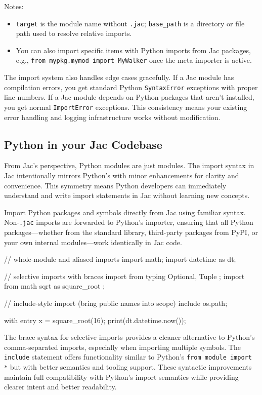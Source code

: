 Notes:
\begin{itemize}
    \item \texttt{target} is the module name without \texttt{.jac}; \texttt{base\_path} is a directory or file path used to resolve relative imports.
    \item You can also import specific items with Python imports from Jac packages, e.g., \texttt{from mypkg.mymod import MyWalker} once the meta importer is active.
\end{itemize}

The import system also handles edge cases gracefully. If a Jac module has compilation errors, you get standard Python \texttt{SyntaxError} exceptions with proper line numbers. If a Jac module depends on Python packages that aren't installed, you get normal \texttt{ImportError} exceptions. This consistency means your existing error handling and logging infrastructure works without modification.

\subsection{Python in your Jac Codebase}

From Jac's perspective, Python modules are just modules. The import syntax in Jac intentionally mirrors Python's with minor enhancements for clarity and convenience. This symmetry means Python developers can immediately understand and write import statements in Jac without learning new concepts.

Import Python packages and symbols directly from Jac using familiar syntax. Non-\texttt{.jac} imports are forwarded to Python's importer, ensuring that all Python packages—whether from the standard library, third-party packages from PyPI, or your own internal modules—work identically in Jac code.

\begin{jacblock}
// whole-module and aliased imports
import math;
import datetime as dt;

// selective imports with braces
import from typing { Optional, Tuple };
import from math { sqrt as square_root };

// include-style import (bring public names into scope)
include os.path;

with entry {
    x = square_root(16);
    print(dt.datetime.now());
}
\end{jacblock}

The brace syntax for selective imports provides a cleaner alternative to Python's comma-separated imports, especially when importing multiple symbols. The \texttt{include} statement offers functionality similar to Python's \texttt{from module import *} but with better semantics and tooling support. These syntactic improvements maintain full compatibility with Python's import semantics while providing clearer intent and better readability.

